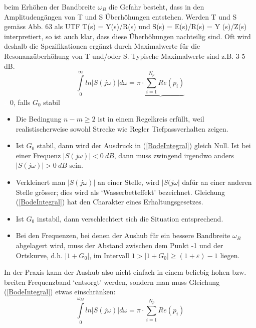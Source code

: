 beim Erhöhen der Bandbreite $\omega_B$
die Gefahr besteht, dass in den Amplitudengängen von T und S Überhöhungen
entstehen. Werden T und S gemäss Abb. 63 als UTF T(s) = Y(s)/R(s) und
S(s) = E(s)/R(s) = Y (s)/Z(s) interpretiert, so ist auch klar, dass diese Überhöhungen
nachteilig sind. Oft wird deshalb die Spezifikationen ergänzt durch Maximalwerte für die Resonanzüberhöhung von
T und/oder S. Typische Maximalwerte sind z.B. 3-5 dB.
\begin{equation}
\int\limits_{0}^{\infty}ln|S(j\omega)|d\omega =\underbrace{\pi\cdot\sum\limits_{i=1}^{N_{p}}Re(p_i)}
\label{BodeIntegral}
\end{equation}
\textcolor{white}{x} \hspace{9.5cm} 0, falls $G_0$ stabil 
\begin{itemize}
	\item Die Bedingung $n-m \geq 2$ ist in einem Regelkreis erfüllt, weil realistischerweise
	sowohl Strecke wie Regler Tiefpassverhalten zeigen.
	\item Ist $G_0$ stabil, dann wird der Ausdruck in (\ref{BodeIntegral}) gleich Null. Ist bei einer Frequenz
	$|S(j\omega)| < 0 \ dB$, dann muss zwingend irgendwo anders $|S(j\omega)| > 0 \ dB$ sein.
	\item Verkleinert man $|S(j\omega)|$ an einer Stelle, wird $|S(j\omega|$ dafür an einer anderen
	Stelle grösser; dies wird als ‘Wasserbetteffekt’ bezeichnet.
	Gleichung (\ref{BodeIntegral}) hat den Charakter eines Erhaltungsgesetzes.
	\item Ist $G_0$ instabil, dann verschlechtert sich die Situation entsprechend.
	\item Bei den Frequenzen, bei denen
	der Aushub für ein bessere Bandbreite $\omega_B$ abgelagert wird, muss der Abstand zwischen dem Punkt -1 und der
	Ortskurve, d.h. $|1 + G_0|$, im Intervall $1 > |1 + G_0| \geq (1 + \varepsilon)-1$ liegen.
\end{itemize}

In der Praxis kann der Aushub also nicht einfach in einem beliebig hohen bzw.
breiten Frequenzband ‘entsorgt’ werden, sondern man muss Gleichung (\ref{BodeIntegral}) etwas
einschränken:
\begin{equation}
\int\limits_{0}^{\omega_M}ln|S(j\omega)|d\omega =\pi\cdot\sum\limits_{i=1}^{N_{p}}Re(p_i)
\end{equation}